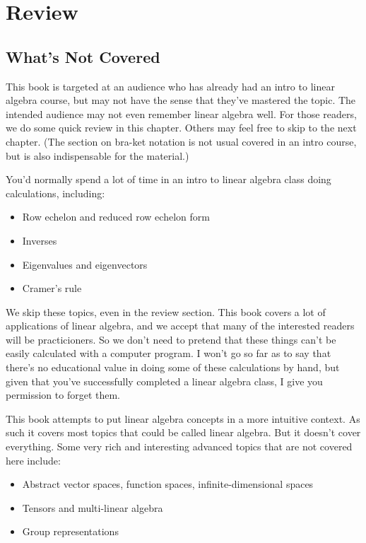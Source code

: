 \documentclass{amsbook}
\begin{document}
\setcounter{chapter}{-1}
\chapter{Review}
\section{What's Not Covered}

This book is targeted at an audience who has already had an intro to linear algebra course, but may not have the sense that they've mastered the topic.  The intended audience may not even remember linear algebra well.  For those readers, we do some quick review in this chapter.  Others may feel free to skip to the next chapter.  (The section on bra-ket notation is not usual covered in an intro course, but is also indispensable for the material.)

You'd normally spend a lot of time in an intro to linear algebra class doing calculations, including:

\begin{itemize}
\item Row echelon and reduced row echelon form
\item Inverses
\item Eigenvalues and eigenvectors
\item Cramer's rule
\end{itemize}

We skip these topics, even in the review section.  This book covers a lot of applications of linear algebra, and we accept that many of the interested readers will be practicioners.  So we don't need to pretend that these things can't be easily calculated with a computer program.  I won't go so far as to say that there's no educational value in doing some of these calculations by hand, but given that you've successfully completed a linear algebra class, I give you permission to forget them.

This book attempts to put linear algebra concepts in a more intuitive context.  As such it covers most topics that could be called linear algebra.  But it doesn't cover everything.  Some very rich and interesting advanced topics that are not covered here include:

\begin{itemize}
\item Abstract vector spaces, function spaces, infinite-dimensional spaces
\item Tensors and multi-linear algebra
\item Group representations
\end{itemize}
\end{document}

